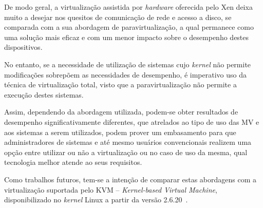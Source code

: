 \documentclass[times, 10pt,twocolumn]{article}
\def\hw{\textit{hardware}\xspace}
\def\kernel{\textit{kernel}\xspace}
\begin{document}
De modo geral, a virtualização assistida por \hw oferecida pelo Xen deixa muito a 
desejar nos quesitos de comunicação de rede e acesso a disco, se comparada com a 
sua abordagem de  paravirtualização, a qual permanece como uma solução mais eficaz 
e com um menor impacto sobre o desempenho destes dispositivos. 

No entanto, se a necessidade de utilização de sistemas cujo \kernel não permite
modificações sobrepõem as necessidades de desempenho, é imperativo uso da técnica de
virtualização total, visto que a paravirtualização não permite a execução destes 
sistemas.

Assim, dependendo da abordagem utilizada, podem-se obter resultados de desempenho 
significativamente diferentes, que atrelados ao tipo de uso das MV e aos 
sistemas a serem utilizados, podem prover um embasamento para que administradores 
de sistemas e até mesmo usuários convencionais realizem uma opção entre utilizar ou
não a virtualização ou no caso de uso da mesma, qual tecnologia  melhor atende 
ao seus requisitos. 

Como trabalhos futuros, tem-se a intenção de comparar estas abordagens com a 
virtualização suportada pelo KVM -- \textit{Kernel-based Virtual Machine},
disponibilizado no \kernel Linux a partir da versão 2.6.20~\cite{kvm}.



\end{document}
